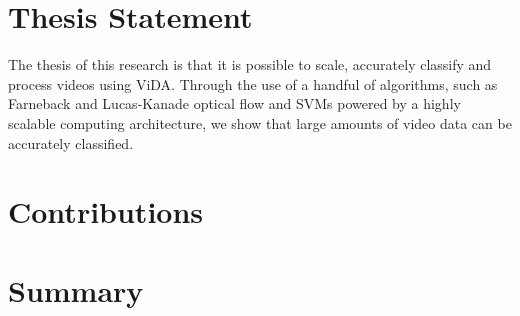\section{\label{section:thesis_statement}Thesis Statement}
The thesis of this research is that it is possible to scale, accurately
classify and process videos using ViDA. Through the use of a handful of algorithms,
such as Farneback and Lucas-Kanade optical flow and SVMs powered by a highly scalable
computing architecture, we show that large amounts of video data can be
accurately classified.

\section{\label{section:contributions}Contributions}
\section{\label{section:summary}Summary}
